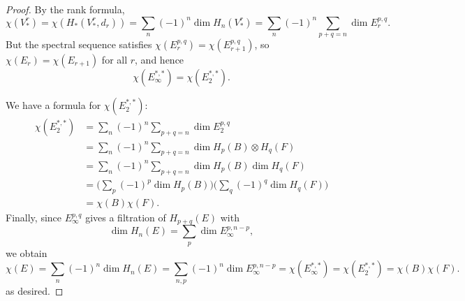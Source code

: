 \documentclass[12pt]{article}
\begin{document}
\begin{proof}
By the rank formula, 
\[
\chi(V_\ast^r) = \chi(H_\ast(V_\ast^r, d_r)) = \sum_n (-1)^n \dim H_n(V_\ast^r) = \sum_n (-1)^n \sum_{p+q=n} \dim E_r^{p,q}.
\]
But the spectral sequence satisfies $\chi(E_r^{p,q}) = \chi(E_{r+1}^{p,q})$, 
so $\chi(E_r) = \chi(E_{r+1})$ for all $r$, and hence
\[
\chi(E_\infty^{\ast,\ast}) = \chi(E_2^{\ast,\ast}).
\]

We have a formula for $\chi(E_2^{\ast,\ast})$:
\begin{align*}
\chi(E_2^{\ast,\ast})
&= \sum_n (-1)^n \sum_{p+q=n} \dim E_2^{p,q} \\
&= \sum_n (-1)^n \sum_{p+q=n} \dim H_p(B)\otimes H_q(F) \\
&= \sum_n (-1)^n \sum_{p+q=n} \dim H_p(B)\dim H_q(F) \\
&= \Big(\sum_p (-1)^p \dim H_p(B)\Big)\Big(\sum_q (-1)^q \dim H_q(F)\Big) \\
&= \chi(B)\chi(F).
\end{align*}
Finally, since $E_\infty^{p,q}$ gives a filtration of $H_{p+q}(E)$ with 
\[
\dim H_n(E) = \sum_p \dim E_\infty^{p,n-p},
\]
we obtain
\[
\chi(E) = \sum_n (-1)^n \dim H_n(E) 
= \sum_{n,p} (-1)^{n} \dim E_\infty^{p,n-p}
= \chi(E_\infty^{\ast,\ast})
= \chi(E_2^{\ast,\ast})
= \chi(B)\chi(F).
\] as desired.
\end{proof}
\end{document}

